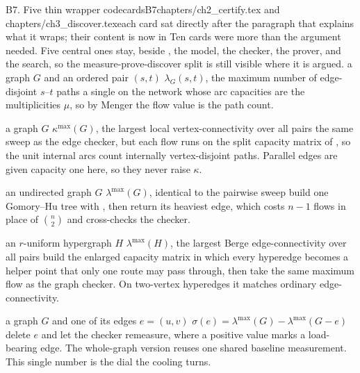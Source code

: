 \begin{offcut}{B7. Five thin wrapper codecards}{B7}{chapters/ch2\_certify.tex and chapters/ch3\_discover.tex}{each card sat directly after the paragraph that explains what it wraps; their content is now in }{Ten cards were more than the argument needed. Five central ones stay, beside , the model, the checker, the prover, and the search, so the measure-prove-discover split is still visible where it is argued.}
{a graph $G$ and an ordered pair $(s,t)$}
{$\lambda_G(s,t)$, the maximum number of edge-disjoint $s$--$t$ paths}
{a single  on the network whose arc capacities are the multiplicities $\mu$, so by Menger the flow value is the path count.}

{a graph $G$}
{$\kappa^{\max}(G)$, the largest local vertex-connectivity over all pairs}
{the same sweep as the edge checker, but each flow runs on the split capacity matrix  of , so the unit internal arcs count internally vertex-disjoint paths. Parallel edges are given capacity one here, so they never raise $\kappa$.}

{an undirected graph $G$}
{$\lambda^{\max}(G)$, identical to the pairwise sweep}
{build one Gomory--Hu tree with , then return its heaviest edge, which costs $n-1$ flows in place of $\binom{n}{2}$ and cross-checks the checker.}

{an $r$-uniform hypergraph $H$}
{$\lambda^{\max}(H)$, the largest Berge edge-connectivity over all pairs}
{build the enlarged capacity matrix  in which every hyperedge becomes a helper point that only one route may pass through, then take the same maximum flow as the graph checker. On two-vertex hyperedges it matches ordinary edge-connectivity.}

{a graph $G$ and one of its edges $e = (u,v)$}
{$\sigma(e) = \lambda^{\max}(G) - \lambda^{\max}(G - e)$}
{delete $e$ and let the checker remeasure, where a positive value marks a load-bearing edge. The whole-graph version  reuses one shared baseline measurement. This single number is the dial the cooling turns.}
\end{offcut}

